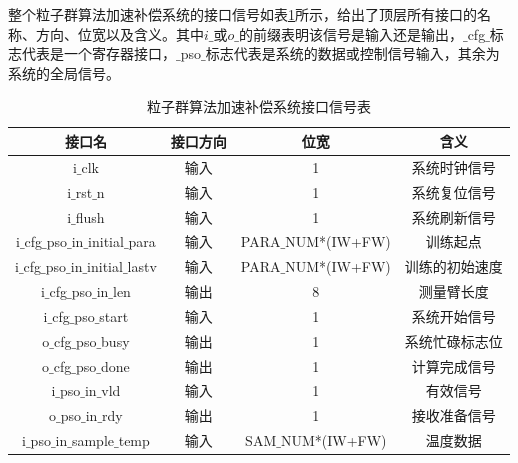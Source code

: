 整个粒子群算法加速补偿系统的接口信号如表\ref{tab:粒子群算法加速补偿系统接口信号表}所示，给出了顶层所有接口的名称、方向、位宽以及含义。其中$i\_$或$o\_$的前缀表明该信号是输入还是输出，$\_$cfg$\_$标志代表是一个寄存器接口，$\_$pso$\_$标志代表是系统的数据或控制信号输入，其余为系统的全局信号。
\begin{table}[htb]
    \centering
    \caption{粒子群算法加速补偿系统接口信号表}
    \label{tab:粒子群算法加速补偿系统接口信号表}
    \begin{tabular}{c|c|c|c}
        \hline
        接口名                                       & 接口方向  & 位宽               &含义                         \\ \hline
        i$\_$clk                                    & 输入      & 1                     & 系统时钟信号              \\ \hline
        i$\_$rst$\_$n                               & 输入      & 1                     & 系统复位信号   \\ \hline
        i$\_$flush                                  & 输入      & 1                     & 系统刷新信号              \\ \hline
        i$\_$cfg$\_$pso$\_$in$\_$initial$\_$para    & 输入      & PARA$\_$NUM*(IW+FW)   & 训练起点                 \\ \hline
        i$\_$cfg$\_$pso$\_$in$\_$initial$\_$lastv   & 输入      & PARA$\_$NUM*(IW+FW)   & 训练的初始速度            \\ \hline
        i$\_$cfg$\_$pso$\_$in$\_$len                & 输出      & 8                     & 测量臂长度                \\ \hline
        i$\_$cfg$\_$pso$\_$start                    & 输入      & 1                     & 系统开始信号              \\ \hline
        o$\_$cfg$\_$pso$\_$busy                     & 输出      & 1                     & 系统忙碌标志位            \\ \hline
        o$\_$cfg$\_$pso$\_$done                     & 输出      & 1                     & 计算完成信号              \\ \hline
        i$\_$pso$\_$in$\_$vld                       & 输入      & 1                     & 有效信号            \\ \hline
        o$\_$pso$\_$in$\_$rdy                       & 输出      & 1                     & 接收准备信号          \\ \hline
        i$\_$pso$\_$in$\_$sample$\_$temp            & 输入      & SAM$\_$NUM*(IW+FW)    & 温度数据            \\ \hline

\end{tabular}
\end{table}
